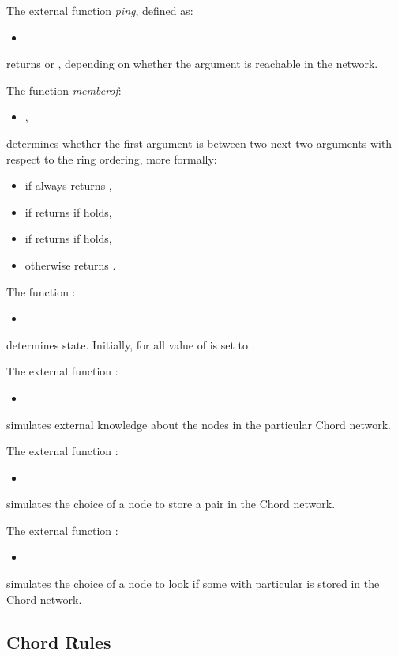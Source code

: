 \documentclass{amsart}
\theoremstyle{definition}
\begin{document}
The external function {\em ping}, defined as:
\begin{itemize}
    \item 
\end{itemize}
returns  or , depending on whether the argument is reachable in the network.






The function {\em memberof}:
\begin{itemize}
    \item ,
\end{itemize}
determines whether the first argument is between two next two arguments with respect to the ring ordering,
more formally:
\begin{itemize}
  \item if  always returns ,
  \item if  returns  if  holds,
  \item if  returns  if  holds,
  \item otherwise returns .
\end{itemize}








The function :
\begin{itemize}
\item 
\end{itemize}
determines  state. Initially, for all  value of  is set to .




The external function :
\begin{itemize}
  \item 
\end{itemize}
simulates external knowledge about the nodes in the particular Chord network.

The external function :
\begin{itemize}
  \item 
\end{itemize}
simulates the choice of a node to store a  pair in the Chord network.

The external function :
\begin{itemize}
  \item 
\end{itemize}
simulates the choice of a node to look if some  with particular  is stored in the Chord network.


\subsection{Chord Rules}
\label{peer_modul}
\end{document}

